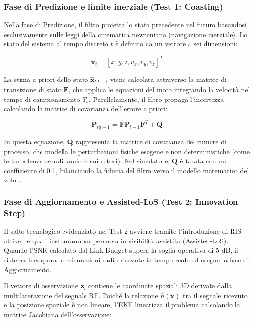\documentclass[twoside]{article}
\begin{document}
\subsubsection{Fase di Predizione e limite inerziale (Test 1: Coasting)}

Nella fase di Predizione, il filtro proietta lo stato precedente nel futuro basandosi esclusivamente sulle leggi della cinematica newtoniana (navigazione inerziale). Lo stato del sistema al tempo discreto $t$ è definito da un vettore a sei dimensioni:

\begin{equation}
\mathbf{x}_t = [x, y, z, v_x, v_y, v_z]^T
\label{eq:ekf_state}
\end{equation}

La stima a priori dello stato $\hat{\mathbf{x}}_{t|t-1}$ viene calcolata attraverso la matrice di transizione di stato $\mathbf{F}$, che applica le equazioni del moto integrando la velocità nel tempo di campionamento $T_s$. Parallelamente, il filtro propaga l'incertezza calcolando la matrice di covarianza dell'errore a priori: 

\begin{equation}
\mathbf{P}_{t|t-1} = \mathbf{F} \mathbf{P}_{t-1} \mathbf{F}^T + \mathbf{Q}
\label{eq:ekf_prior_cov}
\end{equation}

In questa equazione, $\mathbf{Q}$ rappresenta la matrice di covarianza del rumore di processo, che modella le perturbazioni fisiche esogene e non deterministiche (come le turbolenze aerodinamiche sui rotori). Nel simulatore, $\mathbf{Q}$ è tarata con un coefficiente di 0.1, bilanciando la fiducia del filtro verso il modello matematico del volo \cite{Ye2023}.

\subsubsection{Fase di Aggiornamento e Assisted-LoS (Test 2: Innovation Step)}

Il salto tecnologico evidenziato nel Test 2 avviene tramite l'introduzione di RIS attive, le quali instaurano un percorso in visibilità assistita (Assisted-LoS). Quando l'SNR calcolato dal Link Budget supera la soglia operativa di 5 dB, il sistema incorpora le misurazioni radio ricevute in tempo reale ed esegue la fase di Aggiornamento.

Il vettore di osservazione $\mathbf{z}_t$ contiene le coordinate spaziali 3D derivate dalla multilaterazione del segnale RF. Poiché la relazione $h(\mathbf{x})$ tra il segnale ricevuto e la posizione spaziale è non lineare, l'EKF linearizza il problema calcolando la matrice Jacobiana dell'osservazione:
\end{document}

